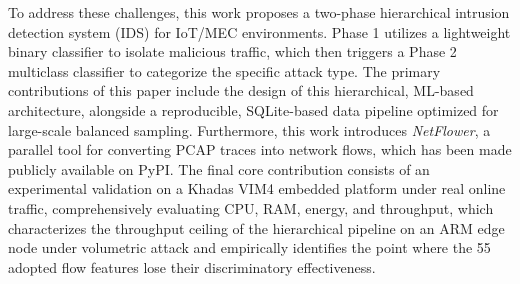 \documentclass[conference]{IEEEtran}
\begin{document}
To address these challenges, this work proposes a two-phase hierarchical intrusion detection system (IDS) for IoT/MEC environments. Phase 1 utilizes a lightweight binary classifier to isolate malicious traffic, which then triggers a Phase 2 multiclass classifier to categorize the specific attack type. The primary contributions of this paper include the design of this hierarchical, ML-based architecture, alongside a reproducible, SQLite-based data pipeline optimized for large-scale balanced sampling. Furthermore, this work introduces \textit{NetFlower}, a parallel tool for converting PCAP traces into network flows, which has been made publicly available on PyPI. The final core contribution consists of an experimental validation on a Khadas VIM4 embedded platform under real online traffic, comprehensively evaluating CPU, RAM, energy, and throughput, which characterizes the throughput ceiling of the hierarchical pipeline on an ARM edge node under volumetric attack and empirically identifies the point where the 55 adopted flow features lose their discriminatory effectiveness.




\end{document}
